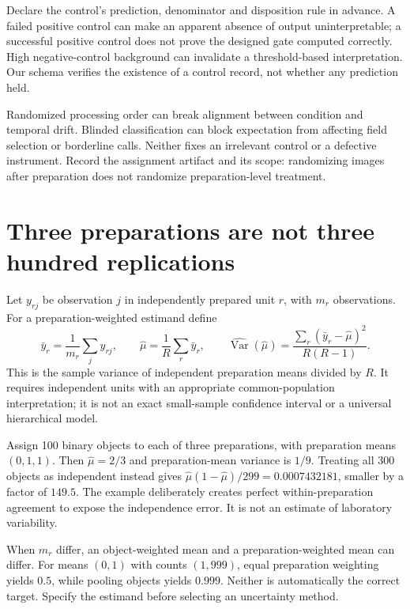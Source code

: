 Declare the control's prediction, denominator and disposition rule in advance.
A failed positive control can make an apparent absence of output uninterpretable;
a successful positive control does not prove the designed gate computed correctly.
High negative-control background can invalidate a threshold-based interpretation.
Our schema verifies the existence of a control record, not whether any prediction held.

Randomized processing order can break alignment between condition and temporal
drift. Blinded classification can block expectation from affecting field selection
or borderline calls. Neither fixes an irrelevant control or a defective instrument.
Record the assignment artifact and its scope: randomizing images after preparation
does not randomize preparation-level treatment.

\section{Three preparations are not three hundred replications}
Let $y_{rj}$ be observation $j$ in independently prepared unit $r$, with $m_r$
observations. For a preparation-weighted estimand define
\[
\bar y_r=\frac{1}{m_r}\sum_j y_{rj},\qquad
\hat\mu=\frac1R\sum_r\bar y_r,\qquad
\widehat{\operatorname{Var}}(\hat\mu)=
\frac{\sum_r(\bar y_r-\hat\mu)^2}{R(R-1)}.
\]
This is the sample variance of independent preparation means divided by $R$.
It requires independent units with an appropriate common-population interpretation;
it is not an exact small-sample confidence interval or a universal hierarchical model.

Assign 100 binary objects to each of three preparations, with preparation means
$(0,1,1)$. Then $\hat\mu=2/3$ and preparation-mean variance is $1/9$.
Treating all 300 objects as independent instead gives
$\hat\mu(1-\hat\mu)/299=0.0007432181$, smaller by a factor of $149.5$.
The example deliberately creates perfect within-preparation agreement to expose
the independence error. It is not an estimate of laboratory variability.

When $m_r$ differ, an object-weighted mean and a preparation-weighted mean can differ.
For means $(0,1)$ with counts $(1,999)$, equal preparation weighting yields $0.5$,
while pooling objects yields $0.999$. Neither is automatically the correct target.
Specify the estimand before selecting an uncertainty method.

